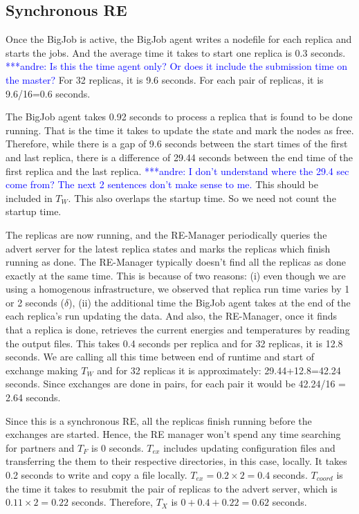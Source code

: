 \documentclass{rspublic}
\newcommand{\alnote}[1]{ {\textcolor{blue} { ***andre: #1 }}}
\newcommand{\alnote}[1]{}
\begin{document}
\subsection{Synchronous RE}
Once the BigJob is active, the BigJob agent writes a nodefile for each
replica and starts the jobs. And the average time it takes to start
one replica is 0.3 seconds.  \alnote{Is this the time agent only? Or
  does it include the submission time on the master?}  For 32
replicas, it is 9.6 seconds. For each pair of replicas, it is
9.6/16=0.6 seconds.

The BigJob agent takes 0.92 seconds to process a replica that is found
to be done running. That is the time it takes to update the state and
mark the nodes as free. Therefore, while there is a gap of 9.6 seconds
between the start times of the first and last replica, there is a
difference of 29.44 seconds between the end time of the first replica
and the last replica. \alnote{I don't understand where the 29.4 sec
  come from? The next 2 sentences don't make sense to me.}  This
should be included in $T_W$. This also overlaps the startup time. So
we need not count the startup time.

The replicas are now running, and the RE-Manager periodically queries
the advert server for the latest replica states and marks the replicas
which finish running as done. The RE-Manager typically doesn't find
all the replicas as done exactly at the same time. This is because of
two reasons: (i) even though we are using a homogenous infrastructure,
we observed that replica run time varies by 1 or 2 seconds ($\delta$),
(ii) the additional time the BigJob agent takes at the end of the each
replica's run updating the data. And also, the RE-Manager, once it
finds that a replica is done, retrieves the current energies and
temperatures by reading the output files. This takes 0.4 seconds per
replica and for 32 replicas, it is 12.8 seconds.  We are calling all
this time between end of runtime and start of exchange making $T_W$
and for 32 replicas it is approximately: 29.44+12.8=42.24
seconds. Since exchanges are done in pairs, for each pair it would be
42.24/16 = 2.64 seconds.

Since this is a synchronous RE, all the replicas finish running before
the exchanges are started.  Hence, the RE manager won't spend any time
searching for partners and $T_F$ is 0 seconds. $T_{ex}$ includes
updating configuration files and transferring the them to their
respective directories, in this case, locally. It takes 0.2 seconds to
write and copy a file locally. $T_{ex} = 0.2 \times 2=0.4$
seconds. $T_{coord}$ is the time it takes to resubmit the pair of
replicas to the advert server, which is $0.11\times 2 = 0.22$
seconds. Therefore, $T_X$ is $0+0.4+0.22=0.62$ seconds.
\end{document}

